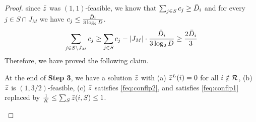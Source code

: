 \begin{proof}
since $\bar z$ was $(1,1)$-feasible, we know that $\sum_{j\in S} c_j \geq \bar{D}_i$ and for every $j\in S\cap J_M$ we have $c_j \leq \frac{\bar{D}_i}{3\log_2 D}$.
\[
\sum_{j\in S\setminus J_M} c_j \geq  \sum_{j\in S} c_j - |J_M|\cdot \frac{\bar{D}_i}{3\log_2 D} \geq \frac{2\bar{D}_i}{3}
\]
Therefore, we have proved the following claim.
\begin{claim}\label{fclm:007}
At the end of {\bf  Step 3}, we have a solution $\bar z$ with (a) $\bar z^L(i) = 0$ for all $i\notin {\cal R}$, (b) $\bar z$ is $(1,3/2)$-feasible,
(c) $\bar z$ satisfies \eqref{feq:conflp2}, and satisfies \eqref{feq:conflp1} replaced by $\frac{1}{K} \leq \sum_S \bar z(i,S) \leq 1$.
%
%	
\end{claim}
\smallskip


\end{proof}
